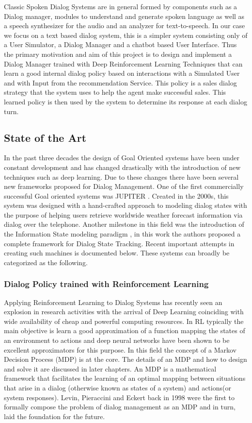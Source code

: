 \documentclass[14pt]{extarticle}
\numberwithin{equation}{section}
\begin{document}
	Classic Spoken Dialog Systems are in general formed by components such as a Dialog manager, modules to understand and generate spoken language as well as a speech synthesizer for the audio and an analyzer for text-to-speech. In our case we focus on a text based dialog system, this is a simpler system consisting only of a User Simulator, a Dialog Manager and a chatbot based User Interface. Thus the primary motivation and aim of this project is to design and implement a Dialog Manager trained with Deep Reinforcement Learning Techniques that can learn a good internal dialog policy based on interactions with a Simulated User and with Input from the recommendation Service. This policy is a sales dialog strategy that the system uses to help the agent make successful sales. This learned policy is then used by the system to determine its response at each dialog turn.
	\subsection{State of the Art}
	In the past three decades the design of Goal Oriented systems have been under constant development and has changed drastically with the introduction of new techniques such as deep learning. Due to these changes there have been several new frameworks proposed for Dialog Management. One of the first commercially successful Goal oriented systems was JUPITER \cite{zue_jupiter}. Created in the 2000s, this system was designed with a hand-crafted approach to modeling dialog states with the purpose of helping users retrieve worldwide weather forecast information via dialog over the telephone. Another milestone in this field was the introduction of the Information State modeling paradigm \cite{Larsson:2000:ISD:973935.973943}, in this work the authors proposed a complete framework for Dialog State Tracking.
	Recent important attempts in creating such machines is documented below. These systems can broadly be categorized as the following.
	\subsubsection{Dialog Policy trained with Reinforcement Learning}
	Applying Reinforcement Learning to Dialog Systems has recently seen an explosion in research activities with the arrival of Deep Learning coinciding with wide availability of cheap and powerful computing resources. In RL typically the main objective is learn a good approximation of a function mapping the states of an environment to actions and deep neural networks have been shown to be excellent approximators for this purpose. In this field the concept of a Markov Decision Process (MDP) is at the core. The details of an MDP and how to design and solve it are discussed in later chapters. An MDP is a mathematical framework that facilitates the learning of an optimal mapping between situations that arise in a dialog (otherwise known as states of a system) and actions(or system responses)\cite{mdp-bellmann}. Levin, Pieraccini and Eckert back in 1998 were the first to formally compose the problem of dialog management as an MDP \cite{mdp-pieraccini} and in turn, laid the foundation for the future.
	
\end{document}
